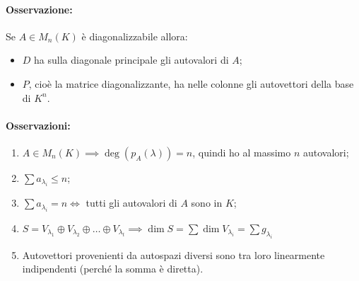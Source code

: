 \documentclass[twoside]{report}
\begin{document}
\paragraph{Osservazione:} Se \(A \in M_n(K)\) è diagonalizzabile allora:
\begin{itemize}
    \item \(D\) ha sulla diagonale principale gli autovalori di \(A\);
    \item \(P\), cioè la matrice diagonalizzante, ha nelle colonne gli autovettori della base di \(K^{n}\).
\end{itemize}



\paragraph{Osservazioni:} 
\begin{enumerate}
    \item \(A \in M_n(K) \implies \deg(p_A(\lambda )) = n\), quindi ho al massimo \(n\) autovalori;
    \item \(\sum a_{\lambda _i}\le n\);
    \item \(\sum a_{\lambda _i}= n \iff\) tutti gli autovalori di \(A\) sono in \(K\);
    \item \(S =V_{\lambda _1} \oplus V_{\lambda _2} \oplus \ldots \oplus V_{\lambda _t} \implies \dim S = \sum \dim V_{\lambda _i} = \sum g_{\lambda _i}\)
    \item Autovettori provenienti da autospazi diversi sono tra loro linearmente indipendenti (perché la somma è diretta).
\end{enumerate}
\end{document}
